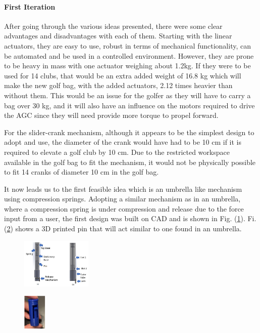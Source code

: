 \documentclass[11pt,landscape]{article}
\begin{document}
\begin{multicols}{3}
\paragraph{First Iteration}
After going through the various ideas presented, there were some clear
advantages and disadvantages with each of them. Starting with the linear
actuators, they are easy to use, robust in terms of mechanical functionality,
can be automated and be used in a controlled environment. However, they are
prone to be heavy in mass with one actuator weighing about 1.2kg.  If they were
to be used for 14 clubs, that would be an extra added weight of 16.8 kg which
will make the new golf bag, with the added actuators, 2.12 times heavier than
without them. This would be an issue for the golfer as they will have to carry a
bag over 30 kg, and it will also have an influence on the motors required to
drive the AGC since they will need provide more torque to propel forward.

For
the slider-crank mechanism, although it appears to be the simplest design to
adopt and use, the diameter of the crank would have had to be 10 cm if it is
required to elevate a golf club by 10 cm. Due to the restricted workspace
available in the golf bag to fit the mechanism, it would not be physically
possible to fit 14 cranks of diameter 10 cm in the golf bag. 

It now leads us to
the first feasible idea which is an umbrella like mechanism using compression
springs. Adopting a similar mechanism as in an umbrella, where a compression
spring is under compression and release due to the force input from a user, the
first design was built on CAD and is shown in Fig. (\ref{fig:init_release_mech}).
Fi. (\ref{fig:pin}) shows a 3D printed pin that will act similar to one found in an
umbrella.

\begin{figure}[H]
    \begin{center}
        \includegraphics[width=0.3\textwidth]{Init Release Mech.PNG}
        \label{fig:init_release_mech}
    \end{center}
\end{figure}
\begin{figure}[H]
    \begin{center}
        \includegraphics[width=0.1\textwidth]{pin.PNG}
        \label{fig:pin}
    \end{center}
\end{figure}


\end{multicols}
\end{document}
